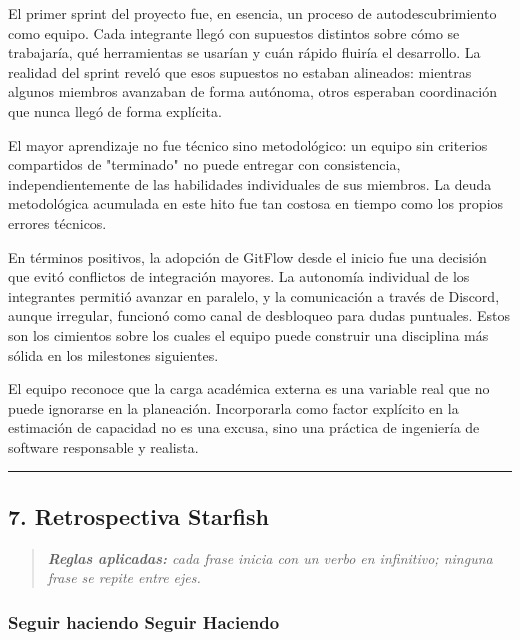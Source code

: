 \documentclass[11pt,a4paper]{article}
\begin{document}
El primer sprint del proyecto fue, en esencia, un proceso de autodescubrimiento como equipo. Cada integrante llegó con supuestos distintos sobre cómo se trabajaría, qué herramientas se usarían y cuán rápido fluiría el desarrollo. La realidad del sprint reveló que esos supuestos no estaban alineados: mientras algunos miembros avanzaban de forma autónoma, otros esperaban coordinación que nunca llegó de forma explícita.

El mayor aprendizaje no fue técnico sino metodológico: un equipo sin criterios compartidos de "terminado" no puede entregar con consistencia, independientemente de las habilidades individuales de sus miembros. La deuda metodológica acumulada en este hito fue tan costosa en tiempo como los propios errores técnicos.

En términos positivos, la adopción de GitFlow desde el inicio fue una decisión que evitó conflictos de integración mayores. La autonomía individual de los integrantes permitió avanzar en paralelo, y la comunicación a través de Discord, aunque irregular, funcionó como canal de desbloqueo para dudas puntuales. Estos son los cimientos sobre los cuales el equipo puede construir una disciplina más sólida en los milestones siguientes.

El equipo reconoce que la carga académica externa es una variable real que no puede ignorarse en la planeación. Incorporarla como factor explícito en la estimación de capacidad no es una excusa, sino una práctica de ingeniería de software responsable y realista.

\vspace{0.6em}\hrule\vspace{0.8em}

\subsection{7. Retrospectiva Starfish}

\begin{quote}\itshape
\textbf{Reglas aplicadas:} cada frase inicia con un verbo en infinitivo; ninguna frase se repite entre ejes.\\
\end{quote}

\subsubsection{Seguir haciendo Seguir Haciendo}
\end{document}
